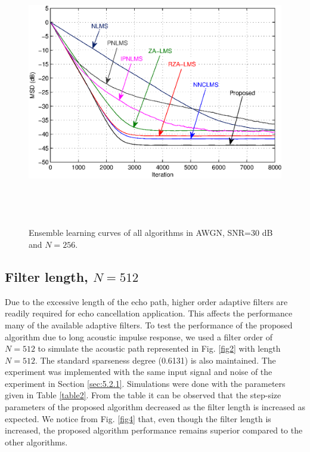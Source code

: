 
\begin{figure}[!htb]
\begin{center}
\vspace{1cm}
\includegraphics[width=14.25cm, height=11cm]{Figures/Chapter5/fig3a.eps}\\
\end{center}
\vspace{-1cm}
\caption{Ensemble learning curves of all algorithms in AWGN, SNR=30 dB and $N=256$.}
\label{fig3}
\vspace{1.5cm}
\end{figure}


\vspace{-0.3cm}
\subsection{Filter length, $N=512$}\label{sec:5.2.1.2}
\vspace{-0.5cm}
\noindent Due to the excessive length of the echo path, higher order adaptive filters are readily required for echo cancellation application. This affects the performance many of the available adaptive filters. To test the performance of the proposed algorithm due to long acoustic impulse response, we used a filter order of $N=512$ to simulate the acoustic path represented in Fig. \ref{fig2} with length $N=512$. The standard sparseness degree (0.6131) is also maintained. The experiment was implemented with the same input signal and noise of the experiment in Section \ref{sec:5.2.1}. Simulations were done with the parameters given in Table \ref{table2}. From the table it can be observed that the step-size parameters of the proposed algorithm decreased as the filter length is increased as expected. We notice from Fig. \ref{fig4} that, even though the filter length is increased,  the proposed algorithm performance remains superior compared to the other algorithms.



